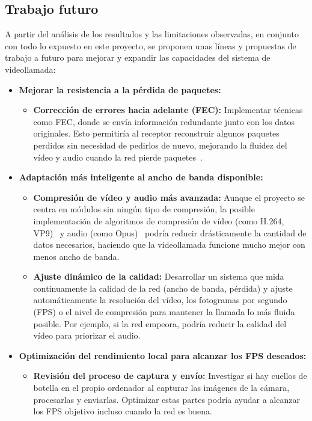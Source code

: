 \subsection{Trabajo futuro}
A partir del análisis de los resultados y las limitaciones observadas, en conjunto con todo lo expuesto en este proyecto, se proponen unas líneas y propuestas de trabajo a futuro para mejorar y expandir las capacidades del sistema de videollamada:

\begin{itemize}
\item \textbf{Mejorar la resistencia a la pérdida de paquetes:}
\begin{itemize}
\item \textbf{Corrección de errores hacia adelante (FEC):} Implementar técnicas como FEC, donde se envía información redundante junto con los datos originales. Esto permitiría al receptor reconstruir algunos paquetes perdidos sin necesidad de pedirlos de nuevo, mejorando la fluidez del vídeo y audio cuando la red pierde paquetes~\cite{fec}.
\end{itemize}
\item \textbf{Adaptación más inteligente al ancho de banda disponible:}
\begin{itemize}
    \item \textbf{Compresión de vídeo y audio más avanzada:} Aunque el proyecto se centra en módulos sin ningún tipo de compresión, la posible implementación de algoritmos de compresión de vídeo (como H.264, VP9)~\cite{h264} y audio (como Opus)~\cite{opus} podría reducir drásticamente la cantidad de datos necesarios, haciendo que la videollamada funcione mucho mejor con menos ancho de banda.
    \item \textbf{Ajuste dinámico de la calidad:} Desarrollar un sistema que mida continuamente la calidad de la red (ancho de banda, pérdida) y ajuste automáticamente la resolución del vídeo, los fotogramas por segundo (FPS) o el nivel de compresión para mantener la llamada lo más fluida posible. Por ejemplo, si la red empeora, podría reducir la calidad del vídeo para priorizar el audio.
\end{itemize}

\item \textbf{Optimización del rendimiento local para alcanzar los FPS deseados:}
\begin{itemize}
    \item \textbf{Revisión del proceso de captura y envío:} Investigar si hay cuellos de botella en el propio ordenador al capturar las imágenes de la cámara, procesarlas y enviarlas. Optimizar estas partes podría ayudar a alcanzar los FPS objetivo incluso cuando la red es buena.
\end{itemize}


\end{itemize}
